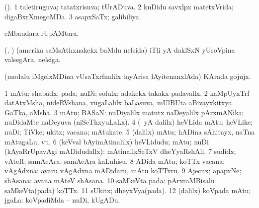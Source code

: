 {{{{{{{\bentry
{} 
\gl{\gu}
\bmng
(\AmA). 
\bnum
\num{1} taletiruguva; tatatxrisuva; tUrADuva. 
\num{2} kuDidu savxlpx matetxVrida; digaBxrXmegoMDa. 
\num{3} asapxSaTx; galibiliya. 
\enum
\emng
\eentry

\bentry
{} 
\gl{\sakirx}
\expl{}
\bmng
{} eMbaudara rUpAMtara. 
\emng
\eentry

\bentry
{}
\gl{\nA}
\expl{}
\bmng
(\ashi, \hiV) (amerika saMsAthxnakekx baMdu nelsida) iTli yA dakiSxN yUroVpina valsegAra, nelsiga. 
\emng
\eentry

\bentry
{} 
\gl{\nA}
\expl{}
\bmng
(modalu iMgelxMDina vUsaTxrfnalilx tayArisa lAyitenanxlAda) KArada gojujx. 
\emng
\eentry

\bentry 
{} 
\gl{\saMkiSx}
\expl{}
\bmng
{} 
\emng
\eentry

\bentry
{} 
\gl{\nA}
\expl{}
\bmng
\bnum
\num{1} mAtu; shabadx; pada; nuDi; solulx:  adakekx takakx padavallx. 
\num{2} kaMpUyxTrf datAtxMsha, nideRVshana, \mo vugaLalilx baLasuva, mUlBUta aBivayxkitxya GaTka, aMsha. 
\num{3} mAtu; BASaN:  nuDiyalilx matutx naDeyalilx pArxmANika; nuDidaMte naDeyuva (niSeThxyuLaLx). 
\num{4} (\bava\ yA \Eva dalilx) heVLida mAtu; heVLike; nuDi; TiVke; ukitx; vacana; mAtukate. 
\num{5} (\bava dalilx) mAtu; hADina sAhitayx, naTna mAtugaLu, \mo vu. 
\num{6} (keVval bAyimAtinalilx) heVLidudu; mAtu; nuDi (kAyaRrUpavAgi mADidudallx):  mAtinallxSeTxV dheYyaRshAli. 
\num{7} sudidx; vAteR; samAcAra:  samAcAra kaLuhisu. 
\num{8} ADida mAtu; koTTx vacana; vAgAdxna:  avaru vAgAdxna mADidaru, mAtu koTTxru. 
\num{9} Ajecnx; apapxNe; shAsana:  avana mAteV shAsana. 
\num{10} saMkeVta pada:  pArxraMBisalu saMkeVta(pada) koTTx. 
\num{11} sUkitx; dheyxVya(pada). 
\num{12} (\bava dalilx) koVpada mAtu; jgaLa:  koVpadiMda -- nuDi, kUgADu. 
\enum
\emng

}}}}}}}
